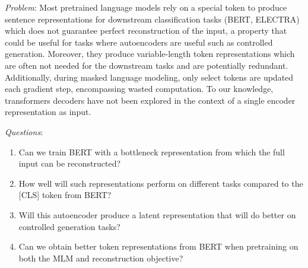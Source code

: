 \noindent \textit{Problem}:
Most pretrained language models rely on a special token to produce sentence representations for downstream classification tasks (BERT, ELECTRA) which does not guarantee perfect reconstruction of the input, a property that could be useful for tasks where autoencoders are useful such as controlled generation.
Moreover, they produce variable-length token representations which are often not needed for the downstream tasks and are potentially redundant. 
Additionally, during masked language modeling, only select tokens are updated each gradient step, encompassing wasted computation. To our knowledge, transformers decoders have not been explored in the context of a single encoder representation as input.

\vspace{3mm} 

\noindent \textit{Questions}:
\begin{enumerate}
    \item Can we train BERT with a bottleneck representation from which the full input can be reconstructed?
    \item How well will such representations perform on different tasks compared to the [CLS] token from BERT?
    \item Will this autoencoder produce a latent representation that will do better on controlled generation tasks?
    \item Can we obtain better token representations from BERT when pretraining on both the MLM and reconstruction objective?
\end{enumerate}

